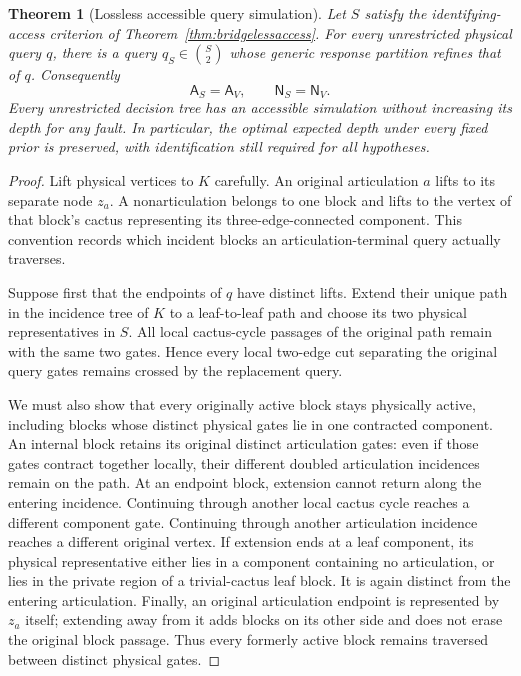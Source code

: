 \documentclass[11pt,letterpaper]{article}
\newtheorem{theorem}{Theorem}
\newcommand{\A}{\mathsf A}
\newcommand{\N}{\mathsf N}
\begin{document}
\begin{theorem}[Lossless accessible query simulation]\label{thm:bridgelessrefinement}
Let $S$ satisfy the identifying-access criterion of Theorem~\ref{thm:bridgelessaccess}. For every unrestricted physical query $q$, there is a query $q_S\in\binom S2$ whose generic response partition refines that of $q$. Consequently
\[
 \A_S=\A_V,\qquad \N_S=\N_V.
\]
Every unrestricted decision tree has an accessible simulation without increasing its depth for any fault. In particular, the optimal expected depth under every fixed prior is preserved, with identification still required for all hypotheses.
\end{theorem}
\begin{proof}
Lift physical vertices to $K$ carefully. An original articulation $a$ lifts to its separate node $z_a$. A nonarticulation belongs to one block and lifts to the vertex of that block's cactus representing its three-edge-connected component. This convention records which incident blocks an articulation-terminal query actually traverses.

Suppose first that the endpoints of $q$ have distinct lifts. Extend their unique path in the incidence tree of $K$ to a leaf-to-leaf path and choose its two physical representatives in $S$. All local cactus-cycle passages of the original path remain with the same two gates. Hence every local two-edge cut separating the original query gates remains crossed by the replacement query.

We must also show that every originally active block stays physically active, including blocks whose distinct physical gates lie in one contracted component. An internal block retains its original distinct articulation gates: even if those gates contract together locally, their different doubled articulation incidences remain on the path. At an endpoint block, extension cannot return along the entering incidence. Continuing through another local cactus cycle reaches a different component gate. Continuing through another articulation incidence reaches a different original vertex. If extension ends at a leaf component, its physical representative either lies in a component containing no articulation, or lies in the private region of a trivial-cactus leaf block. It is again distinct from the entering articulation. Finally, an original articulation endpoint is represented by $z_a$ itself; extending away from it adds blocks on its other side and does not erase the original block passage. Thus every formerly active block remains traversed between distinct physical gates.


\end{proof}
\end{document}
